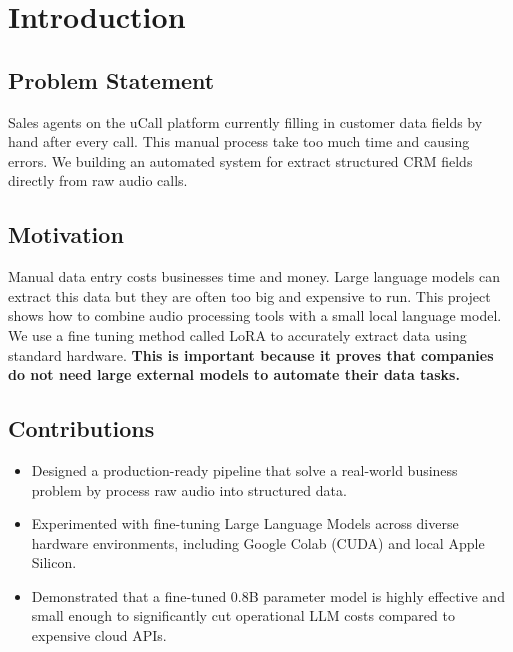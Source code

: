\documentclass[unnumsec,webpdf,modern,large]{oup-authoring-template}%
\theoremstyle{thmstyleone}%
\theoremstyle{thmstyletwo}%
\theoremstyle{thmstylethree}%
\begin{document}
\makeatletter
\@unnumsecfalse
\makeatother
\setcounter{secnumdepth}{2}

\section{Introduction}
\label{sec:introduction}

\subsection{Problem Statement} 
Sales agents on the uCall platform currently filling in customer data fields by hand after every call. This manual process take too much time and causing errors. We building an automated system for extract structured CRM fields directly from raw audio calls.

\subsection{Motivation}
Manual data entry costs businesses time and money. Large language models can extract this data but they are often too big and expensive to run. This project shows how to combine audio processing tools with a small local language model. We use a fine tuning method called LoRA to accurately extract data using standard hardware. \textbf{This is important because it proves that companies do not need large external models to automate their data tasks.}

\subsection{Contributions}
\begin{itemize}
    \item Designed a production-ready pipeline that solve a real-world business problem by process raw audio into structured data.
    \item Experimented with fine-tuning Large Language Models across diverse hardware environments, including Google Colab (CUDA) and local Apple Silicon.
    \item Demonstrated that a fine-tuned 0.8B parameter model is highly effective and small enough to significantly cut operational LLM costs compared to expensive cloud APIs.
\end{itemize}
\end{document}
